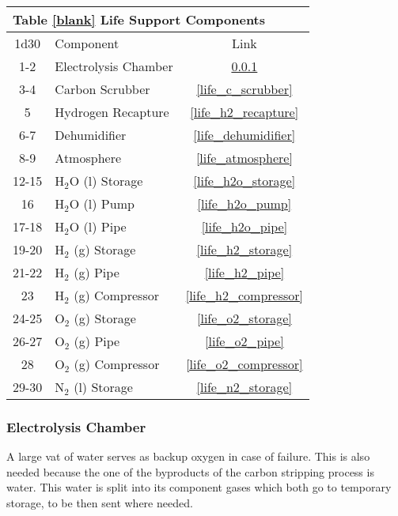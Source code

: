 \documentclass[a4paper]{article}
\begin{document}
\vspace{0.5cm} \hspace{0.25\linewidth}
\begin{tabular}{@{} | c | l | c | @{}}
\toprule
\multicolumn{3}{|l|}{Table \ref{blank} Life Support Components} \\
\toprule
1d30 & Component & Link \\
\midrule
1-2 & Electrolysis Chamber & \ref{life_electrolysis} \\
3-4 & Carbon Scrubber & \ref{life_c_scrubber} \\
5 & Hydrogen Recapture & \ref{life_h2_recapture} \\
6-7 & Dehumidifier & \ref{life_dehumidifier} \\
8-9 & Atmosphere & \ref{life_atmosphere} \\
\midrule
12-15 & H$_2$O (l) Storage & \ref{life_h2o_storage} \\
16 & H$_2$O (l) Pump & \ref{life_h2o_pump} \\
17-18 & H$_2$O (l) Pipe & \ref{life_h2o_pipe} \\
19-20 & H$_2$ (g) Storage & \ref{life_h2_storage} \\
21-22 & H$_2$ (g) Pipe & \ref{life_h2_pipe} \\
23 & H$_2$ (g) Compressor & \ref{life_h2_compressor} \\
24-25 & O$_2$ (g) Storage & \ref{life_o2_storage} \\
26-27 & O$_2$ (g) Pipe & \ref{life_o2_pipe} \\
28 & O$_2$ (g) Compressor & \ref{life_o2_compressor} \\
29-30 & N$_2$ (l) Storage & \ref{life_n2_storage} \\
\bottomrule
\end{tabular}

\hspace{-18pt} \subsubsection{Electrolysis Chamber} \label{life_electrolysis} \vspace{-0.2cm}
A large vat of water serves as backup oxygen in case of failure. This is also needed because the one of the byproducts of the carbon stripping process is water. This water is split into its component gases which both go to temporary storage, to be then sent where needed.
\end{document}
